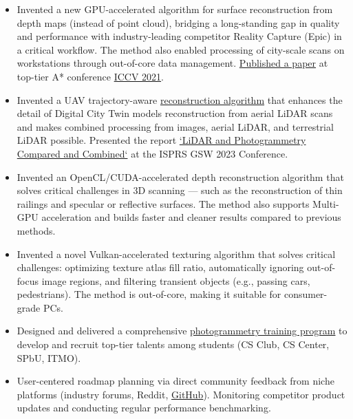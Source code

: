 \documentclass[11pt,oneside]{article}
\newcommand{\hhref}[2]{\href{#1}{\color{blue}#2}}
\begin{document}
\begin{description}
    \begin{itemize}
      \item Invented a new GPU-accelerated algorithm for surface reconstruction from depth maps (instead of point cloud), bridging a long-standing gap in quality and performance with industry-leading competitor Reality Capture (Epic) in a critical workflow. The method also enabled processing of city-scale scans on workstations through out-of-core data management.
\hhref{https://www.polarnick.com/static/papers/poliarnyi2021.pdf}{Published a paper} at top-tier A* conference \hhref{https://openaccess.thecvf.com/content/ICCV2021/html/Poliarnyi_Out-of-Core_Surface_Reconstruction_via_Global_TGV_Minimization_ICCV_2021_paper.html}{ICCV 2021}.
      \item Invented a UAV trajectory-aware \hhref{https://www.youtube.com/watch?v=tiOeMgLHSrA}{reconstruction algorithm} that enhances the detail of Digital City Twin models reconstruction from aerial LiDAR scans and makes combined processing from images, aerial LiDAR, and terrestrial LiDAR possible. Presented the report \hhref{https://polarnick.com/static/presentations/AgisoftMetashapeGSW2023.pdf}{‘LiDAR and Photogrammetry Compared and Combined‘} at the ISPRS GSW 2023 Conference.
      \item Invented an OpenCL/CUDA-accelerated depth reconstruction algorithm that solves critical challenges in 3D scanning — such as the reconstruction of thin railings and specular or reflective surfaces. The method also supports Multi-GPU acceleration and builds faster and cleaner results compared to previous methods.
      \item Invented a novel Vulkan-accelerated texturing algorithm that solves critical challenges: optimizing texture atlas fill ratio, automatically ignoring out-of-focus image regions, and filtering transient objects (e.g., passing cars, pedestrians). The method is out-of-core, making it suitable for consumer-grade PCs.
      \item Designed and delivered a comprehensive \hhref{https://www.youtube.com/playlist?list=PL5p-5hHpsHBp4yTpeZJ_QMSmJPAuov-VF}{photogrammetry training program} to develop and recruit top-tier talents among students (CS Club, CS Center, SPbU, ITMO).
      \item User-centered roadmap planning via direct community feedback from niche platforms (industry forums, Reddit, \hhref{https://github.com/agisoft-llc/metashape-scripts}{GitHub}). Monitoring competitor product updates and conducting regular performance benchmarking.

\end{itemize}
\end{description}
\end{document}
